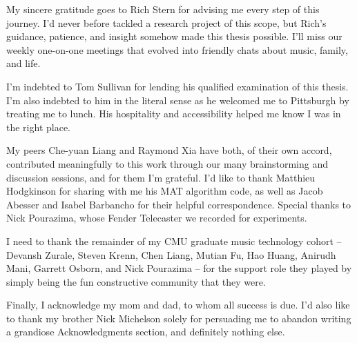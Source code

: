 \documentclass[12pt]{cmuthesis}
\begin{document}
\begin{acknowledgments}
My sincere gratitude goes to Rich Stern for advising me every step of this journey. I'd never before tackled a research project of this scope, but Rich's guidance, patience, and insight somehow made this thesis possible. I'll miss our weekly one-on-one meetings that evolved into friendly chats about music, family, and life.

I'm indebted to Tom Sullivan for lending his qualified examination of this thesis. I'm also indebted to him in the literal sense as he welcomed me to Pittsburgh by treating me to lunch. His hospitality and accessibility helped me know I was in the right place.

My peers Che-yuan Liang and Raymond Xia have both, of their own accord, contributed meaningfully to this work through our many brainstorming and discussion sessions, and for them I'm grateful. I'd like to thank Matthieu Hodgkinson for sharing with me his MAT algorithm code, as well as Jacob Abesser and Isabel Barbancho for their helpful correspondence. Special thanks to Nick Pourazima, whose Fender Telecaster we recorded for experiments.

I need to thank the remainder of my CMU graduate music technology cohort -- Devansh Zurale, Steven Krenn, Chen Liang, Mutian Fu, Hao Huang, Anirudh Mani, Garrett Osborn, and Nick Pourazima -- for the support role they played by simply being the fun constructive community that they were.

Finally, I acknowledge my mom and dad, to whom all success is due. I'd also like to thank my brother Nick Michelson solely for persuading me to abandon writing a grandiose Acknowledgments section, and definitely nothing else.

\end{acknowledgments}



\tableofcontents
\listoffigures
\listoftables

\mainmatter


%
%
%
%
%
\doublespacing
\noindent
\end{document}

